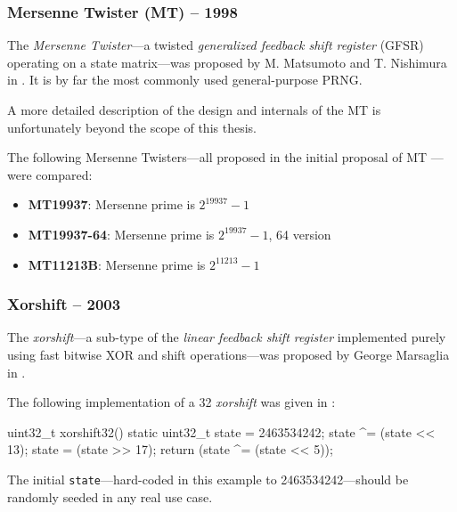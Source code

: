 \subsubsection[Mersenne Twister (MT) -- 1998]{Mersenne Twister (MT) -- 1998} \label{subsubsec:mt}

    The \emph{Mersenne Twister}---a twisted \emph{generalized feedback shift register} (GFSR) operating on a state matrix---was proposed by M. Matsumoto and T. Nishimura in \cite{Matsumoto:1998}. It is by far the most commonly used general-purpose PRNG.

    A more detailed description of the design and internals of the MT is unfortunately beyond the scope of this thesis.

    The following Mersenne Twisters---all proposed in the initial proposal of MT \cite{Matsumoto:1998}---were compared:
    \begin{itemize}
        \itemsep0em
        \item \textbf{MT19937}: Mersenne prime is $2^{19937} - 1$
        \item \textbf{MT19937-64}: Mersenne prime is $2^{19937} - 1$, \SI{64}{\bit} version
        \item \textbf{MT11213B}: Mersenne prime is $2^{11213} - 1$
    \end{itemize}

\subsubsection[Xorshift -- 2003]{Xorshift -- 2003} \label{subsubsec:xorshift}

    The \emph{xorshift}---a sub-type of the \emph{linear feedback shift register} implemented purely using fast bitwise XOR and shift operations---was proposed by George Marsaglia in \cite{Marsaglia:2003}.

    The following implementation of a \SI{32}{\bit} \emph{xorshift} was given in \cite{Marsaglia:2003}:
\begin{@empty}
    \lstset{
        language = [ISO]C++
    }
\begin{centeredshadowboxlisting}
uint32_t xorshift32() {
    static uint32_t state = 2463534242;
    state ^= (state << 13);
    state = (state >> 17);
    return (state ^= (state << 5));
}
\end{centeredshadowboxlisting}
\end{@empty}
    \textcolor{black!75}{The initial \lstinline|state|---hard-coded in this example to 2463534242---should be randomly seeded in any real use case.}

